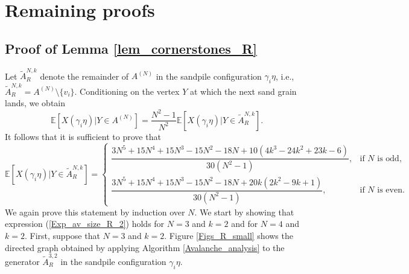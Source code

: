\documentclass{article}
\begin{document}





 

\newpage

\appendix



\section{Remaining proofs}
\label{Appendix}

\subsection*{Proof of Lemma \ref{lem_cornerstones_R}}

Let $\tilde{A}_R^{N,k}$ denote the remainder of $A^{(N)}$ in the sandpile configuration $\gamma_i \eta$, i.e., $\tilde{A}_R^{N,k} = A^{(N)} \setminus \{v_i\}$. Conditioning on the vertex $Y$ at which the next sand grain lands, we obtain
    \begin{equation*}
        \mathbb{E}[X(\gamma_i \eta)|Y \in A^{(N)}] = \dfrac{N^2-1}{N^2} \mathbb{E}[X(\gamma_i \eta)|Y \in \tilde{A}^{N,k}_R].
    \end{equation*}
    It follows that it is sufficient to prove that
\begin{equation}\label{Exp_av_size_R_2}
    \mathbb{E}[X(\gamma_i \eta)|Y \in \tilde{A}^{N,k}_R] = \begin{cases}
        \dfrac{3N^5+15N^4 + 15N^3-15N^2-18N+10(4k^3-24k^2+23k-6)}{30(N^2-1)}, &\text{if } N \text{ is odd,} \\[1.2em]
        \dfrac{3N^5 + 15N^4 + 15N^3 - 15N^2 - 18N + 20k(2k^2-9k+1)}{30(N^2-1)}, &\text{if } N \text{ is even.}
    \end{cases}
\end{equation}
    We again prove this statement by induction over $N$. We start by showing that expression (\ref{Exp_av_size_R_2}) holds for $N = 3$ and $k = 2$ and for $N = 4$ and $k = 2$. First, suppose that $N = 3$ and $k = 2$. Figure \ref{Figs_R_small} shows the directed graph obtained by applying Algorithm \ref{Avalanche_analysis} to the generator $\tilde{A}_R^{3, 2}$ in the sandpile configuration $\gamma_i \eta$.  
\end{document}
